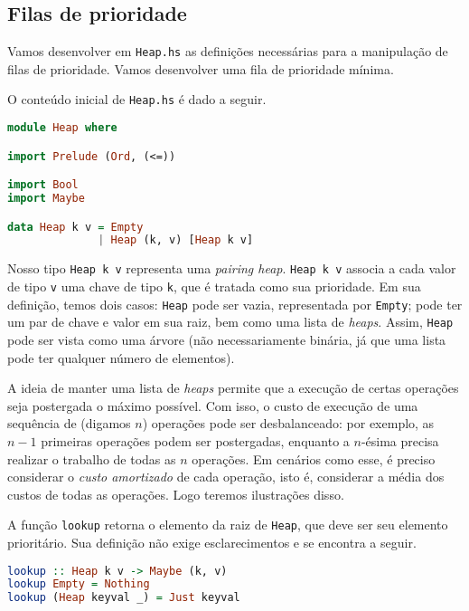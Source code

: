 \documentclass[a4paper]{article}
\begin{document}
\subsection{Filas de prioridade}

Vamos desenvolver em \texttt{Heap.hs} as definições necessárias para a manipulação de filas de prioridade.
Vamos desenvolver uma fila de prioridade mínima.

O conteúdo inicial de \texttt{Heap.hs} é dado a seguir.

\begin{lstlisting}[language=haskell, frame=single]
module Heap where

import Prelude (Ord, (<=))

import Bool
import Maybe

data Heap k v = Empty
              | Heap (k, v) [Heap k v]
\end{lstlisting}

Nosso tipo \texttt{Heap k v} representa uma \emph{pairing heap}.
\texttt{Heap k v} associa a cada valor de tipo \texttt{v} uma chave de tipo \texttt{k}, que é tratada como sua prioridade.
Em sua definição, temos dois casos: \texttt{Heap} pode ser vazia, representada por \texttt{Empty}; pode ter um par de chave e valor em sua raiz, bem como uma lista de \emph{heaps}.
Assim, \texttt{Heap} pode ser vista como uma árvore (não necessariamente binária, já que uma lista pode ter qualquer número de elementos).

A ideia de manter uma lista de \emph{heaps} permite que a execução de certas operações seja postergada o máximo possível.
Com isso, o custo de execução de uma sequência de (digamos $n$) operações pode ser desbalanceado: por exemplo, as $n - 1$ primeiras operações podem ser postergadas, enquanto a $n$-ésima precisa realizar o trabalho de todas as $n$ operações.
Em cenários como esse, é preciso considerar o \emph{custo amortizado} de cada operação, isto é, considerar a média dos custos de todas as operações.
Logo teremos ilustrações disso.

A função \texttt{lookup} retorna o elemento da raiz de \texttt{Heap}, que deve ser seu elemento prioritário.
Sua definição não exige esclarecimentos e se encontra a seguir.

\begin{lstlisting}[language=haskell, frame=single]
lookup :: Heap k v -> Maybe (k, v)
lookup Empty = Nothing
lookup (Heap keyval _) = Just keyval
\end{lstlisting}
\end{document}
